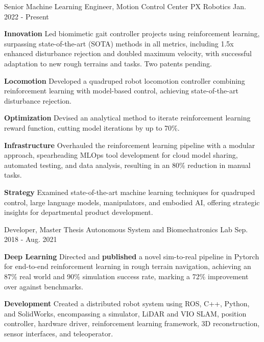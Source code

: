 \begin{cventries}
	\cventry
	{Senior Machine Learning Engineer, Motion Control Center}
	{PX Robotics}
	{Jan. 2022 - Present}
	{}
	{
		\begin{cvitems}
			\item {
				\textbf{Innovation} Led biomimetic gait controller projects using reinforcement learning, surpassing state-of-the-art (SOTA) methods in all metrics, including 1.5x enhanced disturbance rejection and doubled maximum velocity, with successful adaptation to new rough terrains and tasks. Two patents pending.
			}
			\item {
				\textbf{Locomotion} Developed a quadruped robot locomotion controller combining reinforcement learning with model-based control, achieving state-of-the-art disturbance rejection.
			}
			\item {
				\textbf{Optimization} Devised an analytical method to iterate reinforcement learning reward function, cutting model iterations by up to 70\%.
			}
			\item {
				\textbf{Infrastructure} Overhauled the reinforcement learning pipeline with a modular approach, spearheading MLOps tool development for cloud model sharing, automated testing, and data analysis, resulting in an 80\% reduction in manual tasks.
			}
			\item {
				\textbf{Strategy} Examined state-of-the-art machine learning techniques for quadruped control, large language models, manipulators, and embodied AI, offering strategic insights for departmental product development.
			}
		\end{cvitems}
	}
	\cventry
	{Developer, Master Thesis}
	{Autonomous System and Biomechatronics Lab}
	{Sep. 2018 - Aug. 2021}
	{}
	{
		\begin{cvitems}
			\item {
				\textbf{Deep Learning} Directed and \textbf{published} a novel sim-to-real pipeline  in Pytorch for end-to-end reinforcement learning in rough terrain navigation, achieving an 87\% real world and 90\% simulation success rate, marking a 72\% improvement over against benchmarks.
			}
			\item {
				\textbf{Development} Created a distributed robot system using ROS, C++, Python, and SolidWorks, encompassing a simulator, LiDAR and VIO SLAM, position controller, hardware driver, reinforcement learning framework, 3D reconstruction, sensor interfaces, and teleoperator.
}
\end{cvitems}}
\end{cventries}
